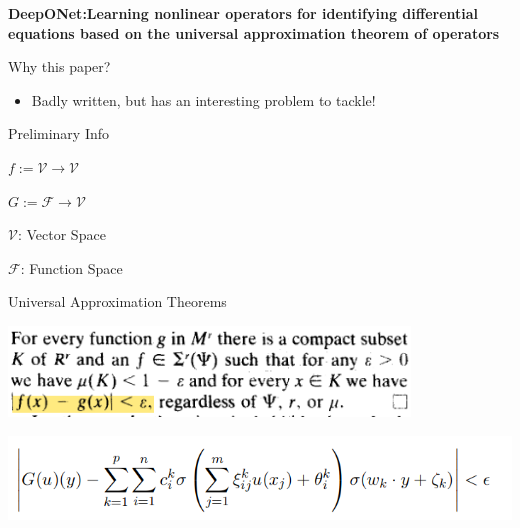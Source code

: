 \documentclass[aspectratio=169]{beamer}
\author{\authorlabel}
\newcommand{\mysubtitle}{\color{Pink}\Large{\textbf{DeepONet:Learning nonlinear operators for identifying differential equations based on the universal approximation theorem of operators}}}
\begin{document}



\begin{frame}
	\centering
	\mysubtitle\cite{lu2021a}
\end{frame}

\begin{frame}{Why this paper?}
	\centering
	  \begin{itemize}
      \item Badly written, but has an interesting problem to tackle!
    \end{itemize}
\end{frame}


\begin{frame}{Preliminary Info}
  \begin{minipage}{0.5\textwidth}
    \color{Pink}{Function}\color{Black}
    \centering

      $f:=\mathcal{V}\to\mathcal{V}$
  \end{minipage}%
  \begin{minipage}{0.5\textwidth}
    \color{Pink}{Operator}\color{Black}
    \centering

      $G:=\mathcal{F}\to\mathcal{V}$
  \end{minipage}
  
  \centering

  $\mathcal{V}$: Vector Space

  $\mathcal{F}$: Function Space
\end{frame}

\begin{frame}{Universal Approximation Theorems}

  \begin{minipage}{0.5\textwidth}
    \color{Pink}{Universal Approximation Theorem for Function}\color{Black}
    \centering

    \includegraphics[width=0.8\textwidth]{Figures/fun.png}\cite{hornik1989}
  \end{minipage}%
  \begin{minipage}{0.5\textwidth}
    \color{Pink}{Universal Approximation Theorem for Operator}\color{Black}
    \centering

    \includegraphics[width=\textwidth]{Figures/op.png}\cite{chen1995}

  \end{minipage}

\end{frame}
\end{document}

